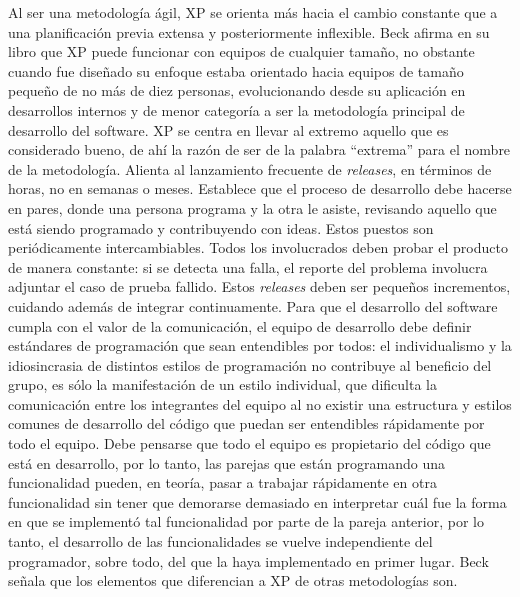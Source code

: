 Al ser una metodología ágil, XP se orienta más hacia el cambio constante que a una planificación previa extensa y posteriormente inflexible. Beck afirma en su libro que XP puede funcionar con equipos de cualquier tamaño, no obstante cuando fue diseñado su enfoque estaba orientado hacia equipos de tamaño pequeño de no más de diez personas, evolucionando desde su aplicación en desarrollos internos y de menor categoría a ser la metodología principal de desarrollo del software.
XP se centra en llevar al extremo aquello que es considerado bueno, de ahí la razón de ser de la palabra ``extrema'' para el nombre de la metodología. Alienta al lanzamiento frecuente de \textit{releases}, en términos de horas, no en semanas o meses. Establece que el proceso de desarrollo debe hacerse en pares, donde una persona programa y la otra le asiste, revisando aquello que está siendo programado y contribuyendo con ideas. Estos puestos son periódicamente intercambiables. Todos los involucrados deben probar el producto de manera constante: si se detecta una falla, el reporte del problema involucra adjuntar el caso de prueba fallido. Estos \textit{releases} deben ser pequeños incrementos, cuidando además de integrar continuamente. Para que el desarrollo del software cumpla con el valor de la comunicación, el equipo de desarrollo debe definir estándares de programación que sean entendibles por todos: el individualismo y la idiosincrasia de distintos estilos de programación no contribuye al beneficio del grupo, es sólo la manifestación de un estilo individual, que dificulta la comunicación entre los integrantes del equipo al no existir una estructura y estilos comunes de desarrollo del código que puedan ser entendibles rápidamente por todo el equipo. Debe pensarse que todo el equipo es propietario del código que está en desarrollo, por lo tanto, las parejas que están programando una funcionalidad pueden, en teoría, pasar a trabajar rápidamente en otra funcionalidad sin tener que demorarse demasiado en interpretar cuál fue la forma en que se implementó tal funcionalidad por parte de la pareja anterior, por lo tanto, el desarrollo de las funcionalidades se vuelve independiente del programador, sobre todo, del que la haya implementado en primer lugar.
Beck señala que los elementos que diferencian a XP de otras metodologías son.
